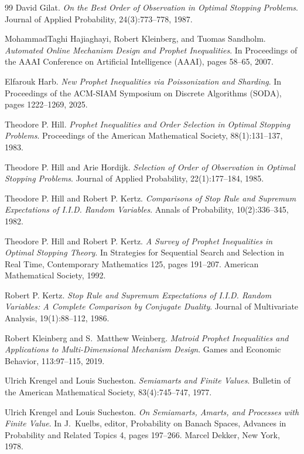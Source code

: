 \documentclass[11pt]{article}
\theoremstyle{definition}
\theoremstyle{remark}
\begin{document}
\begin{thebibliography}{99}
David Gilat.
\emph{On the Best Order of Observation in Optimal Stopping Problems}.
Journal of Applied Probability, 24(3):773--778, 1987.

MohammadTaghi Hajiaghayi, Robert Kleinberg, and Tuomas Sandholm.
\emph{Automated Online Mechanism Design and Prophet Inequalities}.
In Proceedings of the AAAI Conference on Artificial Intelligence (AAAI), pages 58--65, 2007.

Elfarouk Harb.
\emph{New Prophet Inequalities via Poissonization and Sharding}.
In Proceedings of the ACM-SIAM Symposium on Discrete Algorithms (SODA), pages 1222--1269, 2025.

Theodore P. Hill.
\emph{Prophet Inequalities and Order Selection in Optimal Stopping Problems}.
Proceedings of the American Mathematical Society, 88(1):131--137, 1983.

Theodore P. Hill and Arie Hordijk.
\emph{Selection of Order of Observation in Optimal Stopping Problems}.
Journal of Applied Probability, 22(1):177--184, 1985.

Theodore P. Hill and Robert P. Kertz.
\emph{Comparisons of Stop Rule and Supremum Expectations of I.I.D. Random Variables}.
Annals of Probability, 10(2):336--345, 1982.

Theodore P. Hill and Robert P. Kertz.
\emph{A Survey of Prophet Inequalities in Optimal Stopping Theory}.
In Strategies for Sequential Search and Selection in Real Time, Contemporary Mathematics 125, pages 191--207. American Mathematical Society, 1992.

Robert P. Kertz.
\emph{Stop Rule and Supremum Expectations of I.I.D. Random Variables: A Complete Comparison by Conjugate Duality}.
Journal of Multivariate Analysis, 19(1):88--112, 1986.

Robert Kleinberg and S.~Matthew Weinberg.
\emph{Matroid Prophet Inequalities and Applications to Multi-Dimensional Mechanism Design}.
Games and Economic Behavior, 113:97--115, 2019.

Ulrich Krengel and Louis Sucheston.
\emph{Semiamarts and Finite Values}.
Bulletin of the American Mathematical Society, 83(4):745--747, 1977.

Ulrich Krengel and Louis Sucheston.
\emph{On Semiamarts, Amarts, and Processes with Finite Value}.
In J.~Kuelbs, editor, Probability on Banach Spaces, Advances in Probability and Related Topics 4, pages 197--266. Marcel Dekker, New York, 1978.


\end{thebibliography}
\end{document}
